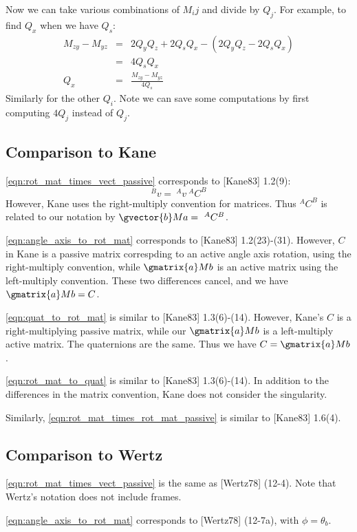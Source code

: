 \documentclass{book}
\numberwithin{equation}{subsection}
\begin{document}
Now we can take various combinations of $M_ij$ and divide by $Q_j$.
For example, to find $Q_x$ when we have $Q_s$:
\begin{eqnarray}
M_{zy} - M_{yz} &=& 2 Q_y Q_z + 2 Q_s Q_x - (2 Q_y Q_z - 2 Q_s Q_x) \nonumber \\
 &=& 4 Q_s Q_x \nonumber \\
Q_x &=& \frac{M_{zy} - M_{yz}}{4 Q_s}
\end{eqnarray}
Similarly for the other $Q_i$. Note we can save some computations by first
computing $4Q_j$ instead of $Q_j$.

\subsection{Comparison to Kane}
\ref{eqn:rot_mat_times_vect_passive} corresponds to [Kane83] 1.2(9):
\begin{equation}
^Bv =\ ^Av \ ^AC^B \nonumber
\end{equation}
However, Kane uses the right-multiply convention for matrices. Thus
$^AC^B$ is related to our notation by $\gvector{b}M{a} =\ ^AC^B$.

\ref{eqn:angle_axis_to_rot_mat} corresponds to [Kane83] 1.2(23)-(31).
However, $C$ in Kane is a passive matrix correspding to an active
angle axis rotation, using the right-multiply
convention, while $\gmatrix{a}M{b}$ is an active matrix using the
left-multiply convention. These two differences cancel, and we have
$\gmatrix{a}M{b} = C$.

\ref{eqn:quat_to_rot_mat} is similar to [Kane83] 1.3(6)-(14). However,
Kane's $C$ is a right-multiplying passive matrix, while our
$\gmatrix{a}M{b}$ is a left-multiply active matrix. The quaternions
are the same. Thus we have $C = \gmatrix{a}M{b}$.

\ref{eqn:rot_mat_to_quat} is similar to [Kane83] 1.3(6)-(14). In
addition to the differences in the matrix convention, Kane does not
consider the singularity.

Similarly, \ref{eqn:rot_mat_times_rot_mat_passive} is similar to
[Kane83] 1.6(4).

\subsection{Comparison to Wertz}
\ref{eqn:rot_mat_times_vect_passive} is the same as [Wertz78] (12-4).
Note that Wertz's notation does not include frames.

\ref{eqn:angle_axis_to_rot_mat} corresponds to [Wertz78] (12-7a), with
$\phi = \theta_b$.
\end{document}
